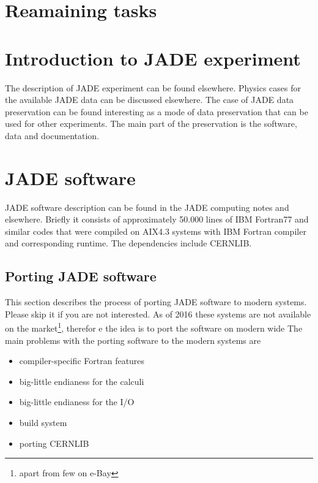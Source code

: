 \section{Reamaining tasks}

\section{Introduction to JADE experiment}
The description of JADE experiment can be found elsewhere.\cite{Bartel:1986ua}
Physics cases for the available JADE data can be discussed elsewhere\cite{Bartel:1986ua}.
The case of JADE data preservation can be found interesting as a mode of data preservation that can be used for other experiments.
The main part of the preservation is the  software, data and documentation.
\section{JADE software}
JADE software description can be found in the JADE computing notes and elsewhere.
Briefly it consists of approximately 50.000 lines of IBM Fortran77 and similar codes 
that were compiled on AIX4.3 systems with IBM Fortran compiler and corresponding runtime.
The dependencies include CERNLIB.


\subsection{Porting JADE software}
This section describes the process of porting JADE software to modern systems.
Please skip it if you are not interested.
As of 2016 these systems are not available on the market\footnote{apart from few on e-Bay},
therefor e the idea is to port the software on modern wide 
The main problems with the porting software to the modern systems are
\begin{itemize}
\item  compiler-specific Fortran features
\item  big-little endianess for the calculi
\item  big-little endianess for the I/O
\item  build system 
\item  porting CERNLIB
\end{itemize}

